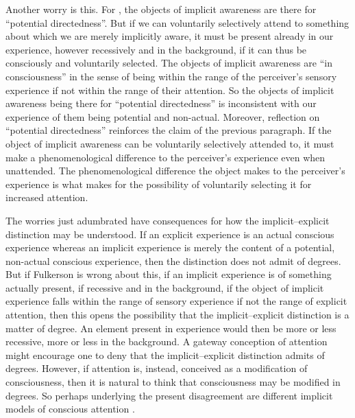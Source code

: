 Another worry is this. For \citet[95]{Fulkerson:2014ek}, the objects of implicit awareness are there for ``potential directedness''. But if we can voluntarily selectively attend to something about which we are merely implicitly aware, it must be present already in our experience, however recessively and in the background, if it can thus be consciously and voluntarily selected. The objects of implicit awareness are ``in consciousness'' in the sense of being within the range of the perceiver's sensory experience if not within the range of their attention. So the objects of implicit awareness being there for ``potential directedness'' is inconsistent with our experience of them being potential and non-actual. Moreover, reflection on ``potential directedness'' reinforces the claim of the previous paragraph. If the object of implicit awareness can be voluntarily selectively attended to, it must make a phenomenological difference to the perceiver's experience even when unattended. The phenomenological difference the object makes to the perceiver's experience is what makes for the possibility of voluntarily selecting it for increased attention.

The worries just adumbrated have consequences for how the implicit--explicit distinction may be understood. If an explicit experience is an actual conscious experience whereas an implicit experience is merely the content of a potential, non-actual conscious experience, then the distinction does not admit of degrees. But if Fulkerson is wrong about this, if an implicit experience is of something actually present, if recessive and in the background, if the object of implicit experience falls within the range of sensory experience if not the range of explicit attention, then this opens the possibility that the implicit--explicit distinction is a matter of degree. An element present in experience would then be more or less recessive, more or less in the background. A gateway conception of attention might encourage one to deny that the implicit--explicit distinction admits of degrees. However, if attention is, instead, conceived as a modification of consciousness, then it is natural to think that consciousness may be modified in degrees. So perhaps underlying the present disagreement are different implicit models of conscious attention \citep[see][for an excellent recent discussion of attention]{Wu:2014aa}.

